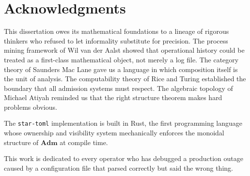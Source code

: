 \documentclass[12pt, letterpaper]{report}
\theoremstyle{plain}
\theoremstyle{definition}
\theoremstyle{remark}
\newcommand{\W}{\mathcal{W}}
\begin{document}
\begin{titlepage}
\begin{abstract}
The witness space $\W = \{0,1\}^{256}$ is an abelian group under XOR.
The witness function $\omega$ is not a group homomorphism; its standing
derives from canonical provenance binding plus BLAKE3 collision resistance.
Witness equality is computational evidence of provenance-tuple equality.

A smooth repair surrogate $\tilde{q}$ is constructed as an approximation
to the discrete standing bit.
The gradient of $\tilde{q}$ is not standing authority; it is an
authoring-time descent field toward feasibility.
LSP repair hints are local gradient approximations of $\tilde{q}$.

Drawing on process mining in the tradition of van der Aalst, the
Object-Centric Event Log is formalized as process history with no standing
authority. Conformance with the admission Petri net is proved equivalent
to BRCE satisfaction.

The phase change is not from ``untested'' to ``tested.''
It is from \emph{unbounded semantic assertion} to \emph{bounded standing
computation.}
\end{abstract}
\end{titlepage}


\chapter*{Acknowledgments}

This dissertation owes its mathematical foundations to a lineage of
rigorous thinkers who refused to let informality substitute for precision.
The process mining framework of Wil van der Aalst showed that operational
history could be treated as a first-class mathematical object, not merely a
log file.
The category theory of Saunders Mac Lane gave us a language in which
composition itself is the unit of analysis.
The computability theory of Rice and Turing established the boundary that
all admission systems must respect.
The algebraic topology of Michael Atiyah reminded us that the right
structure theorem makes hard problems obvious.

The \texttt{star-toml} implementation is built in Rust, the first
programming language whose ownership and visibility system mechanically
enforces the monoidal structure of $\mathbf{Adm}$ at compile time.

This work is dedicated to every operator who has debugged a production
outage caused by a configuration file that parsed correctly but said the
wrong thing.
\end{document}
